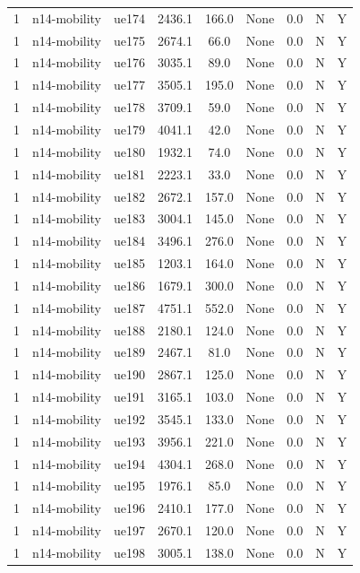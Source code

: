 \begin{table}[ht]
\begin{tabular}{|c|c|c|c|c|c|c|c|c|}
1 & n14-mobility & ue174 & 2436.1 & 166.0 & None & 0.0 & N & Y \\
1 & n14-mobility & ue175 & 2674.1 & 66.0 & None & 0.0 & N & Y \\
1 & n14-mobility & ue176 & 3035.1 & 89.0 & None & 0.0 & N & Y \\
1 & n14-mobility & ue177 & 3505.1 & 195.0 & None & 0.0 & N & Y \\
1 & n14-mobility & ue178 & 3709.1 & 59.0 & None & 0.0 & N & Y \\
1 & n14-mobility & ue179 & 4041.1 & 42.0 & None & 0.0 & N & Y \\
1 & n14-mobility & ue180 & 1932.1 & 74.0 & None & 0.0 & N & Y \\
1 & n14-mobility & ue181 & 2223.1 & 33.0 & None & 0.0 & N & Y \\
1 & n14-mobility & ue182 & 2672.1 & 157.0 & None & 0.0 & N & Y \\
1 & n14-mobility & ue183 & 3004.1 & 145.0 & None & 0.0 & N & Y \\
1 & n14-mobility & ue184 & 3496.1 & 276.0 & None & 0.0 & N & Y \\
1 & n14-mobility & ue185 & 1203.1 & 164.0 & None & 0.0 & N & Y \\
1 & n14-mobility & ue186 & 1679.1 & 300.0 & None & 0.0 & N & Y \\
1 & n14-mobility & ue187 & 4751.1 & 552.0 & None & 0.0 & N & Y \\
1 & n14-mobility & ue188 & 2180.1 & 124.0 & None & 0.0 & N & Y \\
1 & n14-mobility & ue189 & 2467.1 & 81.0 & None & 0.0 & N & Y \\
1 & n14-mobility & ue190 & 2867.1 & 125.0 & None & 0.0 & N & Y \\
1 & n14-mobility & ue191 & 3165.1 & 103.0 & None & 0.0 & N & Y \\
1 & n14-mobility & ue192 & 3545.1 & 133.0 & None & 0.0 & N & Y \\
1 & n14-mobility & ue193 & 3956.1 & 221.0 & None & 0.0 & N & Y \\
1 & n14-mobility & ue194 & 4304.1 & 268.0 & None & 0.0 & N & Y \\
1 & n14-mobility & ue195 & 1976.1 & 85.0 & None & 0.0 & N & Y \\
1 & n14-mobility & ue196 & 2410.1 & 177.0 & None & 0.0 & N & Y \\
1 & n14-mobility & ue197 & 2670.1 & 120.0 & None & 0.0 & N & Y \\
1 & n14-mobility & ue198 & 3005.1 & 138.0 & None & 0.0 & N & Y \\

\end{tabular}
\end{table}
